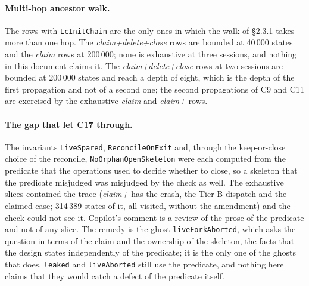 \documentclass[a4paper,10pt,fleqn]{article}
\newcommand{\field}[1]{\texttt{#1}}
\begin{document}
\paragraph{Multi-hop ancestor walk.} The rows with \field{LcInitChain} are
the only ones in which the walk of \S2.3.1 takes more than one hop. The
\emph{claim+delete+close} rows are bounded at 40\,000 states and the
\emph{claim} rows at 200\,000; none is exhaustive at three sessions, and
nothing in this document claims it. The \emph{claim+delete+close} rows at two
sessions are bounded at 200\,000 states and reach a depth of eight, which is
the depth of the first propagation and not of a second one; the second
propagations of C9 and C11 are exercised by the exhaustive \emph{claim} and
\emph{claim+} rows.

\paragraph{The gap that let C17 through.} The invariants \field{LiveSpared},
\field{ReconcileOnExit} and, through the keep-or-close choice of the
reconcile, \field{NoOrphanOpenSkeleton} were each computed from the
predicate that the operations used to decide whether to close, so a
skeleton that the predicate misjudged was misjudged by the check as well. The
exhaustive slices contained the trace (\emph{claim+} has the crash, the Tier B
dispatch and the claimed case; 314\,389 states of it, all visited,
without the amendment) and the check could not see it. Copilot's comment is a review of the prose of the
predicate and not of any slice. The remedy is the ghost
\field{liveForkAborted}, which asks the question in terms of the claim and
the ownership of the skeleton, the facts that the design states
independently of the predicate; it is the only one of the ghosts that does.
\field{leaked} and \field{liveAborted} still use the predicate, and nothing
here claims that they would catch a defect of the predicate itself.
\end{document}
